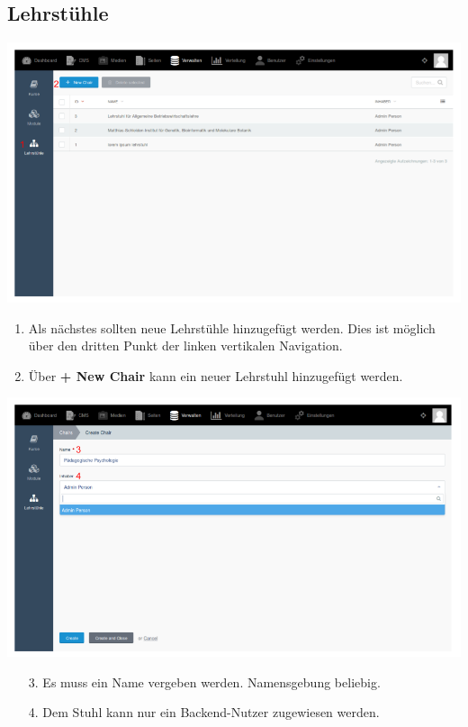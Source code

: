     \subsection{Lehrstühle}
    
    \includegraphics[scale=0.3]{backend/img/chairs_1.png}
    \begin{enumerate}
      \item Als nächstes sollten neue Lehrstühle hinzugefügt werden. Dies ist möglich über den dritten Punkt der linken vertikalen Navigation.
     \item Über \textbf{+ New Chair} kann ein neuer Lehrstuhl hinzugefügt werden. 
    \end{enumerate}

    \includegraphics[scale=0.3]{backend/img/chairs_2.png}
    
    \begin{enumerate}
     \item[3.] Es muss ein Name vergeben werden. Namensgebung beliebig.
     \item[4.] Dem Stuhl kann nur ein Backend-Nutzer zugewiesen werden.
    \end{enumerate}

